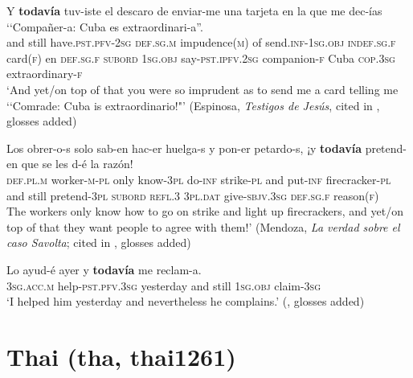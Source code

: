 \begin{exe}
	\ex\label{exAppendixSpanishTodavíaConcessiveConsequent1}
	\gll Y \textbf{todavía} tuv-iste el descaro de enviar-me una tarjeta en la que me dec-ías \lq\lq Compañer-a: Cuba es extraordinari-a”.\\
	and still have.\textsc{pst}.\textsc{pfv}-2\textsc{sg} \textsc{def}.\textsc{sg}.\textsc{m} impudence(\textsc{m}) of send.\textsc{inf}-1\textsc{sg}.\textsc{obj} \textsc{indef}.\textsc{sg}.\textsc{f} card(\textsc{f}) en \textsc{def}.\textsc{sg}.\textsc{f} \textsc{subord} 1\textsc{sg}.\textsc{obj} say-\textsc{pst}.\textsc{ipfv}.2\textsc{sg} \phantom{\lq\lq}companion-\textsc{f} Cuba \textsc{cop}.3\textsc{sg} extraordinary-\textsc{f}\\
	\glt \lq And yet/on top of that you were so imprudent as to send me a card telling me \lq\lq Comrade: Cuba is extraordinario!"' (Espinosa, \textit{Testigos de Jesús}, cited in  \cite[§30.8ñ]{RAEGramatica}, glosses added)

	\ex\label{exAppendixSpanishTodavíaConcessiveConsequent2}
	\gll Los obrer-o-s solo sab-en hac-er huelga-s y pon-er petardo-s, ¡y \textbf{todavía} pretend-en que se les d-é la razón!\\
	\textsc{def}.\textsc{pl}.\textsc{m} worker-\textsc{m}-\textsc{pl} only know-3\textsc{pl} do-\textsc{inf} strike-\textsc{pl} and put-\textsc{inf} firecracker-\textsc{pl} \phantom{¡}and still pretend-3\textsc{pl} \textsc{subord} \textsc{refl}.3 3\textsc{pl}.\textsc{dat} give-\textsc{sbjv}.3\textsc{sg} \textsc{def}.\textsc{sg}.\textsc{f} reason(\textsc{f})\\
	\glt The workers only know how to go on strike and light up firecrackers, and yet/on top of that they want people to agree with them!' (Mendoza, \textit{La verdad sobre el caso Savolta}; cited in \cite[§30.8ñ]{RAEGramatica}, glosses added)

	\ex 
	\gll Lo ayud-é ayer y \textbf{todavía} me reclam-a.\\
	3\textsc{sg}.\textsc{acc}.\textsc{m} help-\textsc{pst}.\textsc{pfv}.3\textsc{sg} yesterday and still 1\textsc{sg}.\textsc{obj} claim-3\textsc{sg}\\
	\glt \lq I helped him yesterday and nevertheless he complains.\rq{ }(\cite[36]{EderlyCurco2016}, glosses added)
\end{exe}

	
\section{Thai (tha, thai1261)}
\label{appendixThai}
